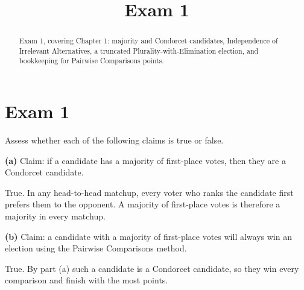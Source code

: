 \documentclass[12pt]{ximera}
\title{Exam 1}
\begin{document}
\begin{abstract}
Exam 1, covering Chapter 1: majority and Condorcet candidates, Independence of Irrelevant
Alternatives, a truncated Plurality-with-Elimination election, and bookkeeping for
Pairwise Comparisons points.
\end{abstract}
\maketitle

\section*{Exam 1}

\begin{problem}
Assess whether each of the following claims is true or false.

\begin{prompt}
\textbf{(a)} Claim: if a candidate has a majority of first-place votes, then they are a
Condorcet candidate.

\begin{multipleChoice}
\end{multipleChoice}

\begin{feedback}
True. In any head-to-head matchup, every voter who ranks the candidate first prefers
them to the opponent. A majority of first-place votes is therefore a majority in every
matchup.
\end{feedback}
\end{prompt}

\begin{prompt}
\textbf{(b)} Claim: a candidate with a majority of first-place votes will always win an
election using the Pairwise Comparisons method.

\begin{multipleChoice}
\end{multipleChoice}

\begin{feedback}
True. By part (a) such a candidate is a Condorcet candidate, so they win every
comparison and finish with the most points.
\end{feedback}
\end{prompt}
\end{problem}
\end{document}
